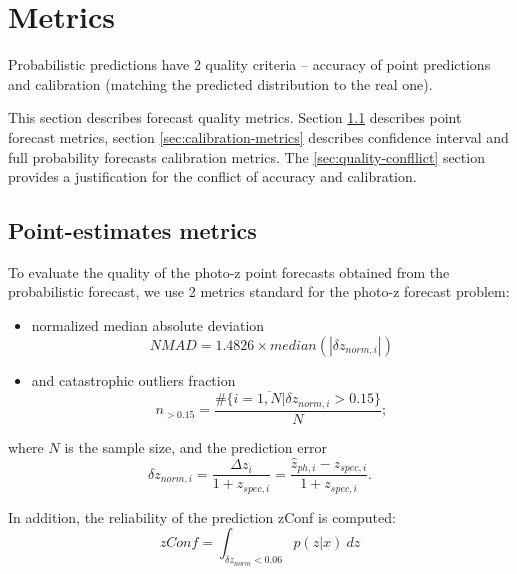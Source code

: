 \documentclass[fleqn,usenatbib]{mnras}
\begin{document}

\section{Metrics}\label{sec:metrics}

Probabilistic predictions have 2 quality criteria -- accuracy of point predictions and calibration (matching the predicted distribution to the real one).

This section describes forecast quality metrics. Section \ref{sec:point-metrics} describes point forecast metrics, section \ref{sec:calibration-metrics} describes confidence interval and full probability forecasts calibration metrics. The \ref{sec:quality-confllict} section provides a justification for the conflict of accuracy and calibration.

\subsection{Point-estimates metrics}\label{sec:point-metrics}

To evaluate the quality of the photo-z point forecasts obtained from the probabilistic forecast, we use 2 metrics standard for the photo-z forecast problem:
\begin{itemize}
    \item normalized median absolute deviation \begin{equation}\label{eq:nmad}
        NMAD = 1.4826 \times median(|\delta z_{norm,i}|)
    \end{equation}
    \item and catastrophic outliers fraction \begin{equation}\label{eq:n015}
        n_{>0.15} = \frac{\#\{i = \overline{1, N} | \delta z_{norm, i} > 0.15\}}{N};
    \end{equation}
\end{itemize}
where \(N\) is the sample size, and the prediction error \begin{equation}\label{eq:dznorm}
    \delta z_{norm,i} = \frac{\Delta z_i}{1+z_{spec,i}} = \frac{\hat{z}_{ph,i} - z_{spec,i}}{1+z_{spec,i}}.
\end{equation}

In addition, the reliability of the prediction zConf is computed: \begin{equation}\label{eq:zconf}
    zConf = \int_{\delta z_{norm} < 0.06} p(z|x)~dz
\end{equation}
\end{document}
